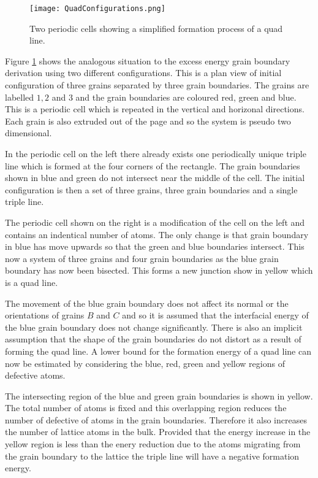 \documentclass[12pt,a4paper]{book}
\begin{document}
\begin{figure}[H]
	\centering
	\texttt{[image: QuadConfigurations.png]} 
\label{fig:1}
\caption{Two periodic cells showing a simplified formation process of a quad line.}
\end{figure}

Figure \ref{fig:1}
 shows the analogous situation to the excess energy grain boundary derivation using two different configurations. This is a plan view of initial configuration of three grains separated by three grain boundaries. The grains are labelled $1, 2$ and $3$ and the grain boundaries are coloured red, green and blue. This is a periodic cell which is repeated in the vertical and horizonal directions. Each grain is also extruded out of the page and so the system is pseudo two dimensional.
 
In the periodic cell on the left there already exists one periodically unique triple line which is formed at the four corners of the rectangle. The grain boundaries shown in blue and green do not intersect near the middle of the cell. The initial configuration is then a set of three grains, three grain boundaries and a single triple line.

The periodic cell shown on the right is a modification of the cell on the left and contains an indentical number of atoms. The only change is that grain boundary in blue has move upwards so that the green and blue boundaries intersect. This now a system of three grains and four grain boundaries as the blue grain boundary has now been bisected. This forms a new junction show in yellow which is a quad line.

The movement of the blue grain boundary does not affect its normal  or the orientations of grains $B$ and $C$ and so it is assumed that the interfacial energy of the blue grain boundary does not change significantly. There is also an implicit assumption that the shape of the grain boundaries do not distort as a result of forming the quad line. A lower bound for the formation energy of a quad line can now be estimated by considering the blue, red, green and yellow regions of defective atoms.

The intersecting region of the blue and green grain boundaries is shown in yellow. The total number of atoms is fixed and this overlapping region reduces the number of defective of atoms in the grain boundaries. Therefore it also increases the number of lattice atoms in the bulk. Provided that the energy increase in the yellow region is less than the enery reduction due to the atoms migrating from the grain boundary to the lattice the triple line will have a negative formation energy. 
 
\end{document}
